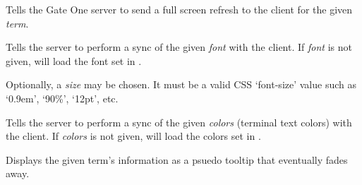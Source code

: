 \documentclass[letterpaper,10pt,openany]{sphinxmanual}
\begin{document}

\begin{fulllineitems}
\label{Applications/terminal/js_terminal:GateOne.Terminal.fullRefresh}
Tells the Gate One server to send a full screen refresh to the client for the given \emph{term}.

\end{fulllineitems}


\begin{fulllineitems}
\label{Applications/terminal/js_terminal:GateOne.Terminal.loadFont}
Tells the server to perform a sync of the given \emph{font} with the client.  If \emph{font} is not given, will load the font set in .

Optionally, a \emph{size} may be chosen.  It must be a valid CSS `font-size' value such as `0.9em', `90\%', `12pt', etc.

\end{fulllineitems}


\begin{fulllineitems}
\label{Applications/terminal/js_terminal:GateOne.Terminal.loadTextColors}
Tells the server to perform a sync of the given \emph{colors} (terminal text colors) with the client.  If \emph{colors} is not given, will load the colors set in .

\end{fulllineitems}


\begin{fulllineitems}
\label{Applications/terminal/js_terminal:GateOne.Terminal.displayTermInfo}
Displays the given term's information as a psuedo tooltip that eventually fades away.

\end{fulllineitems}
\end{document}
